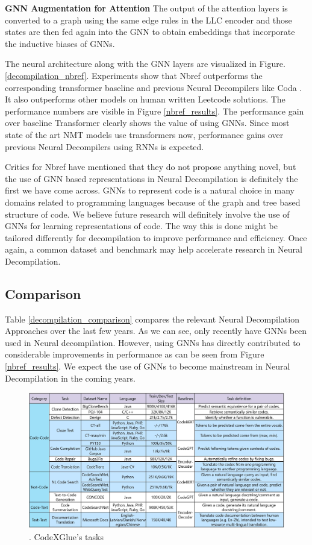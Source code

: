\documentclass{article}
\begin{document}
\textbf{GNN Augmentation for Attention}
The output of the attention layers is converted to a graph using the same edge rules in the LLC encoder and those states are then fed again into the GNN to obtain embeddings that incorporate the inductive biases of GNNs.

The neural architecture along with the GNN layers are visualized in Figure. \ref{decompilation_nbref}. Experiments show that Nbref outperforms the corresponding transformer baseline and previous Neural Decompilers like Coda \cite{coda}. It also outperforms other models on human written Leetcode solutions. The performance numbers are visible in Figure \ref{nbref_results}. The performance gain over baseline Transformer clearly shows the value of using GNNs. Since most state of the art NMT models use transformers now, performance gains over previous Neural Decompilers using RNNs is expected. 

Critics for Nbref have mentioned that they do not propose anything novel, but the use of GNN based representations in Neural Decompilation is definitely the first we have come across. GNNs to represent code is a natural choice in many domains related to programming languages because of the graph and tree based structure of code. We believe future research will definitely involve the use of GNNs for learning representations of code. The way this is done might be tailored differently for decompilation to improve performance and efficiency. Once again, a common dataset and benchmark may help accelerate research in Neural Decompilation. 

\subsection{Comparison}
Table \ref{decompilation_comparison} compares the relevant Neural Decompilation Approaches over the last few years. As we can see, only recently have GNNs been used in Neural decompilation. However, using GNNs has directly contributed to considerable improvements in performance as can be seen from Figure \ref{nbref_results}. We expect the use of GNNs to become mainstream in Neural Decompilation in the coming years.

\begin{figure}[ht]
\centering
\centerline{\includegraphics[width=\textwidth]{Images/codexgluetasks.jpeg}}
\caption{\citet{lu2021codexglue}. CodeXGlue's tasks}
\label{codexgluetasks}
\end{figure}
\end{document}
